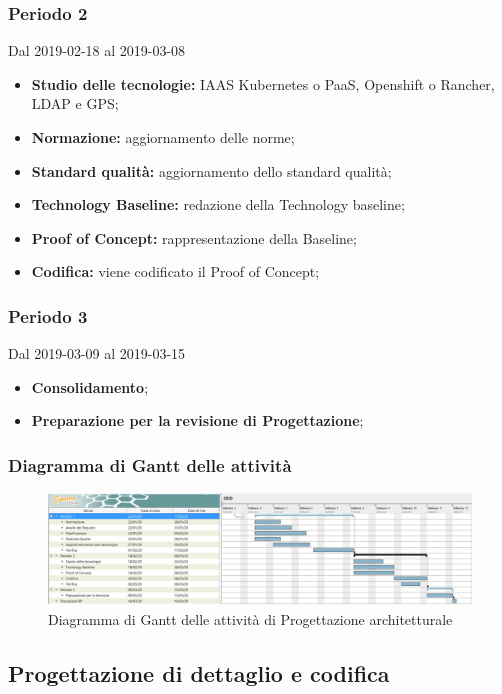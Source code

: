 \subsubsection{Periodo 2} 
Dal 2019-02-18 al 2019-03-08
\begin{itemize}
	\item \textbf{Studio delle tecnologie:} IAAS Kubernetes o PaaS, Openshift o Rancher, LDAP e GPS;
	\item \textbf{Normazione:} aggiornamento delle norme;
	\item \textbf{Standard qualità:} aggiornamento dello standard qualità;
	\item \textbf{Technology Baseline:} redazione della Technology baseline;
	\item \textbf{Proof of Concept:} rappresentazione della Baseline;
	\item \textbf{Codifica:} viene codificato il Proof of Concept;
\end{itemize}
\subsubsection{Periodo 3} 
Dal 2019-03-09 al 2019-03-15
\begin{itemize}
	\item \textbf{Consolidamento};
	\item \textbf{Preparazione per la revisione di Progettazione};
\end{itemize}
\subsubsection{Diagramma di Gantt delle attività}
\begin{figure}[h]
	\includegraphics[scale=0.45]{sezioni/DiagrammiGantt/RP.png}
	\caption{Diagramma di Gantt delle attività di Progettazione architetturale}
\end{figure}

\subsection{Progettazione di dettaglio e codifica}

